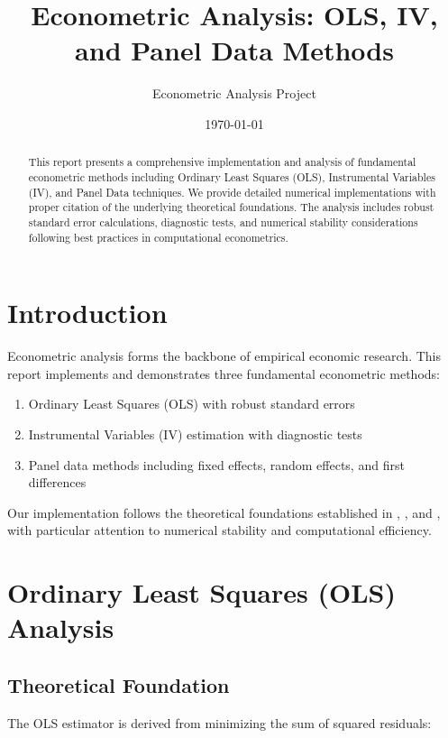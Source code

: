 \documentclass[11pt]{article}
\title{Econometric Analysis: OLS, IV, and Panel Data Methods}
\author{Econometric Analysis Project}
\date{\today}
\begin{document}
\maketitle

\begin{abstract}
This report presents a comprehensive implementation and analysis of fundamental econometric methods including Ordinary Least Squares (OLS), Instrumental Variables (IV), and Panel Data techniques. We provide detailed numerical implementations with proper citation of the underlying theoretical foundations. The analysis includes robust standard error calculations, diagnostic tests, and numerical stability considerations following best practices in computational econometrics.
\end{abstract}

\section{Introduction}

Econometric analysis forms the backbone of empirical economic research. This report implements and demonstrates three fundamental econometric methods:

\begin{enumerate}
\item Ordinary Least Squares (OLS) with robust standard errors
\item Instrumental Variables (IV) estimation with diagnostic tests
\item Panel data methods including fixed effects, random effects, and first differences
\end{enumerate}

Our implementation follows the theoretical foundations established in \citet{wooldridge2010}, \citet{angrist2009}, and \citet{baltagi2013}, with particular attention to numerical stability and computational efficiency.

\section{Ordinary Least Squares (OLS) Analysis}

\subsection{Theoretical Foundation}

The OLS estimator is derived from minimizing the sum of squared residuals:
\end{document}
